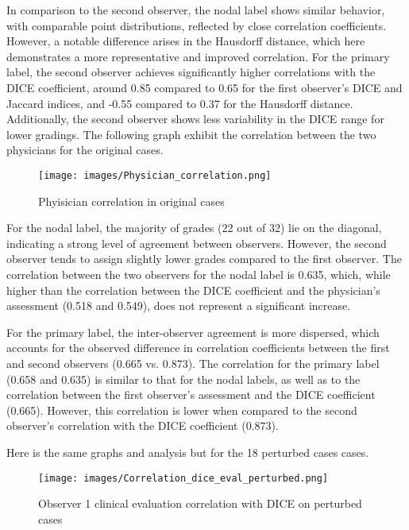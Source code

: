 In comparison to the second observer, the nodal label shows similar behavior, with comparable point distributions, reflected by close correlation coefficients. However, a notable difference arises in the Hausdorff distance, which here demonstrates a more representative and improved correlation. For the primary label, the second observer achieves significantly higher correlations with the DICE coefficient, around 0.85 compared to 0.65 for the first observer's DICE and Jaccard indices, and -0.55 compared to 0.37 for the Hausdorff distance. Additionally, the second observer shows less variability in the DICE range for lower gradings.
\newpage
The following graph exhibit the correlation between the two physicians for the original cases.
\begin{figure}[ht]
    \centering
    \texttt{[image: images/Physician\_correlation.png]}
    \caption{Phyisician correlation in original cases}
    \label{fig:three_subfigures}
\end{figure}

For the nodal label, the majority of grades (22 out of 32) lie on the diagonal, indicating a strong level of agreement between observers. However, the second observer tends to assign slightly lower grades compared to the first observer. The correlation between the two observers for the nodal label is 0.635, which, while higher than the correlation between the DICE coefficient and the physician’s assessment (0.518 and 0.549), does not represent a significant increase.

For the primary label, the inter-observer agreement is more dispersed, which accounts for the observed difference in correlation coefficients between the first and second observers (0.665 vs. 0.873). The correlation for the primary label (0.658 and 0.635) is similar to that for the nodal labels, as well as to the correlation between the first observer’s assessment and the DICE coefficient (0.665). However, this correlation is lower when compared to the second observer’s correlation with the DICE coefficient (0.873).\newpage  

Here is the same graphs and analysis but for the 18 perturbed cases cases.
\begin{figure}[ht]
    \centering
    \texttt{[image: images/Correlation\_dice\_eval\_perturbed.png]}
    \caption{Observer 1 clinical evaluation correlation with DICE on perturbed cases}
    \label{fig:three_subfigures}
\end{figure}

